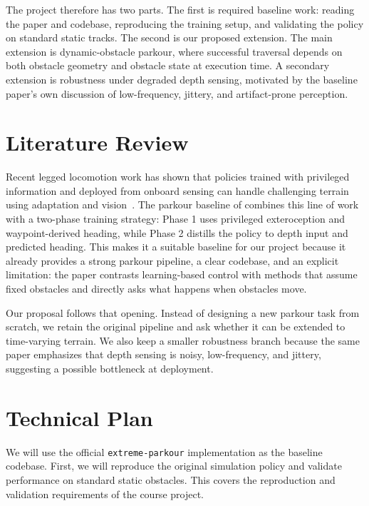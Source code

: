 \documentclass[conference]{IEEEtran}
\begin{document}
The project therefore has two parts. The first is required baseline work: reading the paper and codebase, reproducing the training setup, and validating the policy on standard static tracks. The second is our proposed extension. The main extension is dynamic-obstacle parkour, where successful traversal depends on both obstacle geometry and obstacle state at execution time. A secondary extension is robustness under degraded depth sensing, motivated by the baseline paper's own discussion of low-frequency, jittery, and artifact-prone perception.

\section{Literature Review}
Recent legged locomotion work has shown that policies trained with privileged information and deployed from onboard sensing can handle challenging terrain using adaptation and vision~\citep{kumar2021rma,agarwal2022legged,miki2022learning}. The parkour baseline of \citet{cheng2023parkour} combines this line of work with a two-phase training strategy: Phase 1 uses privileged exteroception and waypoint-derived heading, while Phase 2 distills the policy to depth input and predicted heading. This makes it a suitable baseline for our project because it already provides a strong parkour pipeline, a clear codebase, and an explicit limitation: the paper contrasts learning-based control with methods that assume fixed obstacles and directly asks what happens when obstacles move.

Our proposal follows that opening. Instead of designing a new parkour task from scratch, we retain the original pipeline and ask whether it can be extended to time-varying terrain. We also keep a smaller robustness branch because the same paper emphasizes that depth sensing is noisy, low-frequency, and jittery, suggesting a possible bottleneck at deployment.

\section{Technical Plan}
We will use the official \texttt{extreme-parkour} implementation as the baseline codebase. First, we will reproduce the original simulation policy and validate performance on standard static obstacles. This covers the reproduction and validation requirements of the course project.
\end{document}
